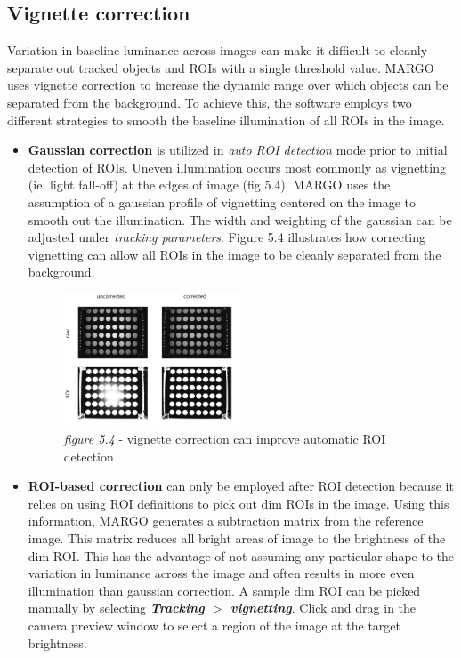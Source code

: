\documentclass[11pt]{article}
\begin{document}
\subsection{Vignette correction}

Variation in baseline luminance across images can make it difficult to cleanly separate out tracked objects and ROIs with a single threshold value. MARGO uses vignette correction to increase the dynamic range over which objects can be separated from the background. To achieve this, the software employs two different strategies to smooth the baseline illumination of all ROIs in the image. 

\begin{itemize}

\item \textbf{Gaussian correction} is utilized in \textit{auto ROI detection} mode prior to initial detection of ROIs. Uneven illumination occurs most commonly as vignetting (ie. light fall-off) at the edges of image (fig 5.4). MARGO uses the assumption of a gaussian profile of vignetting centered on the image to smooth out the illumination. The width and weighting of the gaussian can be adjusted under \textit{tracking parameters}. Figure 5.4 illustrates how correcting vignetting can allow all ROIs in the image to be cleanly separated from the background.

\begin{figure}[h!]
	\vspace*{0.75cm}
	\begin{center}
		\includegraphics[width=0.5\textwidth]{images/vignette_correction/vignette_correction.pdf}
		\caption*{\footnotesize {\textit{figure 5.4} - vignette correction can improve automatic ROI detection}}
	\end{center}
\end{figure}

\item \textbf{ROI-based correction} can only be employed after ROI detection because it relies on using ROI definitions to pick out dim ROIs in the image. Using this information, MARGO generates a subtraction matrix from the reference image. This matrix reduces all bright areas of image to the brightness of the dim ROI. This has the advantage of not assuming any particular shape to the variation in luminance across the image and often results in more even illumination than gaussian correction. A sample dim ROI can be picked manually by selecting \textbf{\textit{Tracking} $>$ \textit{vignetting}}. Click and drag in the camera preview window to select a region of the image at the target brightness.

\end{itemize}
\end{document}
